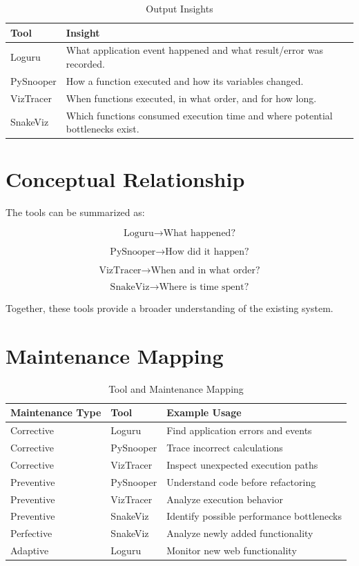 \documentclass[12pt,a4paper]{report}
\begin{document}
\begin{table}[H]
\centering
\caption{Output Insights}
\begin{tabular}{p{3cm}p{8cm}}
\toprule
\textbf{Tool} & \textbf{Insight} \\
\midrule
Loguru & What application event happened and what result/error was recorded. \\
PySnooper & How a function executed and how its variables changed. \\
VizTracer & When functions executed, in what order, and for how long. \\
SnakeViz & Which functions consumed execution time and where potential bottlenecks exist. \\
\bottomrule
\end{tabular}
\end{table}

\section{Conceptual Relationship}

The tools can be summarized as:

\[
\boxed{\text{Loguru} \rightarrow \text{What happened?}}
\]

\[
\boxed{\text{PySnooper} \rightarrow \text{How did it happen?}}
\]

\[
\boxed{\text{VizTracer} \rightarrow \text{When and in what order?}}
\]

\[
\boxed{\text{SnakeViz} \rightarrow \text{Where is time spent?}}
\]

Together, these tools provide a broader understanding of the existing
system.

\section{Maintenance Mapping}

\begin{table}[H]
\centering
\caption{Tool and Maintenance Mapping}
\begin{tabular}{p{4cm}p{3cm}p{5cm}}
\toprule
\textbf{Maintenance Type} & \textbf{Tool} & \textbf{Example Usage} \\
\midrule
Corrective & Loguru & Find application errors and events \\
Corrective & PySnooper & Trace incorrect calculations \\
Corrective & VizTracer & Inspect unexpected execution paths \\
Preventive & PySnooper & Understand code before refactoring \\
Preventive & VizTracer & Analyze execution behavior \\
Preventive & SnakeViz & Identify possible performance bottlenecks \\
Perfective & SnakeViz & Analyze newly added functionality \\
Adaptive & Loguru & Monitor new web functionality \\
\bottomrule
\end{tabular}
\end{table}
\end{document}
